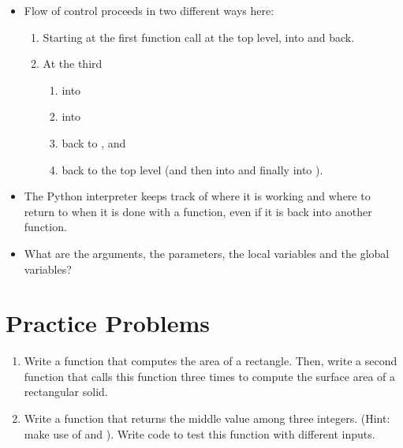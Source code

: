 \documentclass[letterpaper,10pt,english]{sphinxmanual}
\begin{document}
\begin{itemize}
\item {} 
Flow of control proceeds in two different ways here:
\begin{enumerate}
\item {} 
Starting at the first  function call at the top
level, into  and back.

\item {} 
At the third 
\begin{enumerate}
\item {} 
into 

\item {} 
into 

\item {} 
back to , and

\item {} 
back to the top level (and then into  and
finally into ).

\end{enumerate}

\end{enumerate}

\item {} 
The Python interpreter keeps track of where it is working and where
to return to when it is done with a function, even if it is back into
another function.

\item {} 
What are the arguments, the parameters, the local variables and the
global variables?

\end{itemize}


\section{Practice Problems}
\label{\detokenize{lecture_notes/lec05_functions2:practice-problems}}\begin{enumerate}
\item {} 
Write a function that computes the area of a rectangle. Then, write
a second function that calls this function three times to
compute the surface area of a rectangular solid.

\item {} 
Write a function that returns the middle value among three
integers.  (Hint: make use of  and ).  Write
code to test this function with different inputs.

\end{enumerate}
\end{document}
